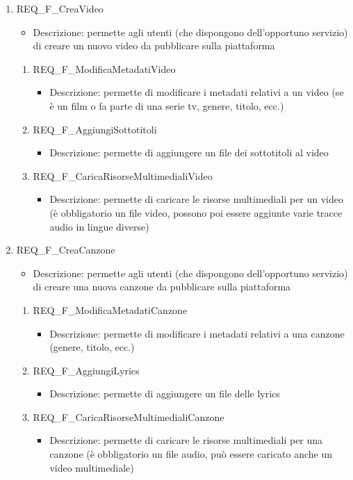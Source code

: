 \begin{enumerate}
\begin{enumerate}[label*=\arabic*.]
		\item REQ\_F\_CreaVideo
		\begin{itemize}
			\item Descrizione: permette agli utenti (che dispongono dell'opportuno servizio) di creare un nuovo video da pubblicare sulla piattaforma
		\end{itemize}
		\begin{enumerate}[label*=\arabic*.]
			\item REQ\_F\_ModificaMetadatiVideo
			\begin{itemize}
				\item Descrizione: permette di modificare i metadati relativi a un video (se è un film o fa parte di una serie tv, genere, titolo, ecc.)
			\end{itemize}
			\item REQ\_F\_AggiungiSottotitoli
			\begin{itemize}
				\item Descrizione: permette di aggiungere un file dei sottotitoli al video
			\end{itemize}
			\item REQ\_F\_CaricaRisorseMultimedialiVideo
			\begin{itemize}
				\item Descrizione: permette di caricare le risorse multimediali per un video (è obbligatorio un file video, possono poi essere aggiunte varie tracce audio in lingue diverse)
			\end{itemize}
		\end{enumerate}
	
		\item REQ\_F\_CreaCanzone
		\begin{itemize}
			\item Descrizione: permette agli utenti (che dispongono dell'opportuno servizio) di creare una nuova canzone da pubblicare sulla piattaforma
		\end{itemize}
		\begin{enumerate}[label*=\arabic*.]
			\item REQ\_F\_ModificaMetadatiCanzone
			\begin{itemize}
				\item Descrizione: permette di modificare i metadati relativi a una canzone (genere, titolo, ecc.)
			\end{itemize}
			\item REQ\_F\_AggiungiLyrics
			\begin{itemize}
				\item Descrizione: permette di aggiungere un file delle lyrics
			\end{itemize}
			\item REQ\_F\_CaricaRisorseMultimedialiCanzone
			\begin{itemize}
				\item Descrizione: permette di caricare le risorse multimediali per una canzone (è obbligatorio un file audio, può essere caricato anche un video multimediale)
			\end{itemize}
		\end{enumerate}	
		

\end{enumerate}
\end{enumerate}
